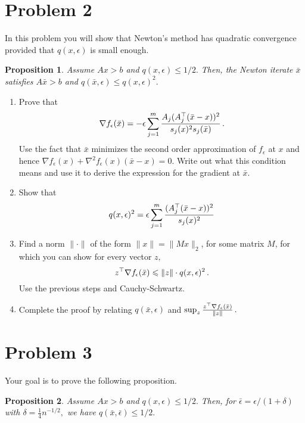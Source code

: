 \documentclass[12pt]{article}
\newtheorem{prop}{Proposition}
\begin{document}
\section*{Problem 2}

In this problem you will show that Newton's method has quadratic convergence
provided that $q(x,\epsilon)$ is small enough.

\begin{prop}
\label{prop:two}
Assume $Ax>b$ and $q(x, \epsilon)\le 1/2.$ Then, the Newton iterate $\bar x$
satisfies $A\bar x>b$ and $q(\bar x, \epsilon)\le q(x, \epsilon)^2.$
\end{prop}

\begin{enumerate}
\item
Prove that
\[
\nabla f_\epsilon(\bar x)
=
-\epsilon \sum_{j=1}^m \frac{A_j(A_j^\top(\bar x - x))^2}{s_j(x)^2s_j(\bar x)}\,.
\]
Use the fact that $\bar x$ minimizes the second order approximation of
$f_\epsilon$ at $x$ and hence $\nabla f_\epsilon(x)+ \nabla^2f_\epsilon(x)(\bar
x-x)=0.$ Write out what this condition means and use it to derive the expression
for the gradient at $\bar x.$

\item
Show that
\[
q(x, \epsilon)^2
= \epsilon\sum_{j=1}^m \frac{(A_j^\top(\bar x-x))^2}{s_j(x)^2}
\]

\item
Find a norm $\|\cdot\|$ of the form $\| x\| = \|M x\|_2$, for some matrix $M$, for which you can show for every vector $z,$
\[
z^\top \nabla f_\epsilon(\bar x) 
\leqslant \|z\|\cdot q(x,\epsilon)^2\,.
\]
Use the previous steps and Cauchy-Schwartz. 

\item
Complete the proof by relating $q(\bar x, \epsilon)$
and $\sup_z 
\frac{z^\top \nabla f_\epsilon(\bar x)}{\|z\|}\,.$
\end{enumerate}


\section*{Problem 3}

Your goal is to prove the following proposition.

\begin{prop}
Assume $Ax>b$ and $q(x, \epsilon)\le1/2.$ Then, for
$\bar\epsilon=\epsilon/(1+\delta)$ with $\delta=\frac14n^{-1/2},$ we have 
$q(\bar x, \bar\epsilon)\le 1/2.$
\end{prop}
\end{document}
